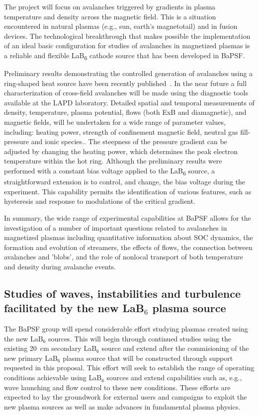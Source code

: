 \documentclass[11pt]{article}
\renewcommand{\cite}{\citep}
\begin{document}
The project will focus on avalanches triggered by gradients in plasma
temperature and density across the magnetic field. This is a situation
encountered in natural plasmas (e.g., sun, earth's magnetotail) and in
fusion devices. The technological breakthrough that makes possible the
implementation of an ideal basic configuration for studies of avalanches
in magnetized plasmas is a reliable and flexible LaB\textsubscript{6}
cathode source that has been developed in BaPSF.

Preliminary results demonstrating the controlled generation of
avalanches using a ring-shaped heat source have been recently
published~\cite{vancompernolle:2015b}. In the near future a full
characterization of cross-field avalanches will be made using the
diagnostic tools available at the LAPD laboratory. Detailed spatial
and temporal measurements of density, temperature, plasma potential,
flows (both ExB and diamagnetic), and magnetic fields, will be
undertaken for a wide range of parameter values, including: heating
power, strength of confinement magnetic field, neutral gas
fill-pressure and ionic species.. The steepness of the pressure
gradient can be adjusted by changing the heating power, which
determines the peak electron temperature within the hot ring. Although
the preliminary results were performed with a constant bias voltage
applied to the LaB\textsubscript{6} source, a straightforward
extension is to control, and change, the bias voltage during the
experiment. This capability permits the identification of various
features, such as hysteresis and response to modulations of the
critical gradient.

In summary, the wide range of experimental capabilities at BaPSF allows
for the investigation of a number of important questions related to
avalanches in magnetized plasmas including quantitative information about SOC dynamics, the formation and evolution
of streamers, the effects of flows, the connection between avalanches
and 'blobs', and the role of nonlocal transport of both temperature and
density during avalanche events.


\subsection{Studies of waves, instabilities and turbulence facilitated
  by the new LaB$_6$ plasma source}

The BaPSF group will spend considerable effort studying plasmas
created using the new LaB$_6$ sources.  This will begin through
continued studies using the existing 20~cm secondary LaB$_6$ source
and extend after the commisioning of the new primary LaB$_6$ plasma
source that will be constructed through support requested in this
proposal.  This effort will seek to establish the range of operating
conditions achievable using LaB$_6$ sources and extend capabilities
such as, e.g., wave launching and flow control to these new
conditions.   These efforts are expected to lay the groundwork for
external users and campaigns to exploit the new plasma sources as well
as make advances in fundamental plasma physics.
\end{document}
